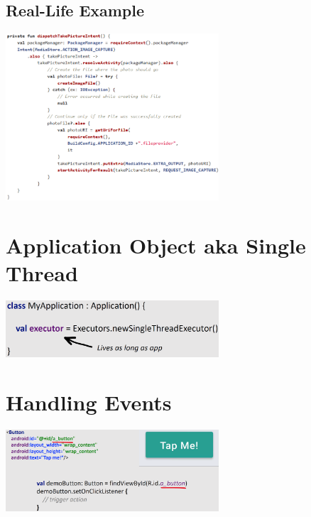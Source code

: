\documentclass{report}
\newenvironment{Figure}
	{\par\medskip\noindent\minipage{\linewidth}}
	{\endminipage\par\medskip}
\theoremstyle{definition}
\theoremstyle{example}
\begin{document}
\subsection{Real-Life Example}
\begin{Figure}
   \centering
    \includegraphics[width=300px]{img/realLifeIntent.png}
        \label{fig:Code Snippet Photo intent from neophyta project}
\end{Figure}

\section{Application Object aka Single Thread}
\begin{Figure}
   \centering
    \includegraphics[width=300px]{img/singleThread.png}
        \label{fig:Code Snippet Creating single Thread which lives as long as app}
\end{Figure}

\section{Handling Events}
\begin{Figure}
   \centering
    \includegraphics[width=300px]{img/HandlingEvents.png}
        \label{fig:Code Snippet handling events}
\end{Figure}
\end{document}
